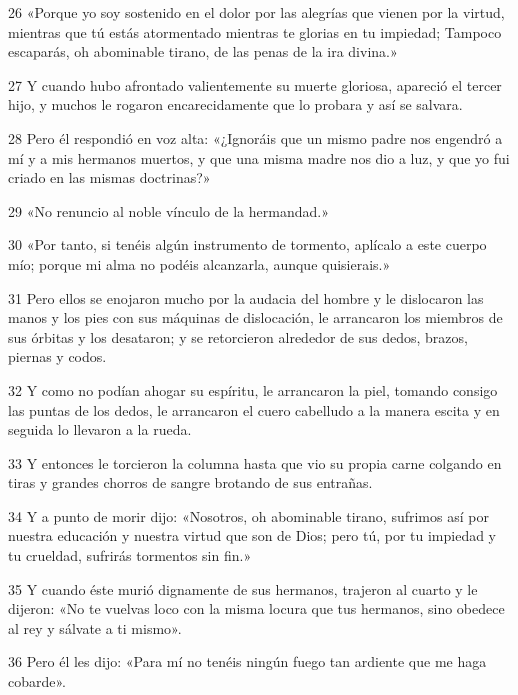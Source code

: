 \par 26 «Porque yo soy sostenido en el dolor por las alegrías que vienen por la virtud, mientras que tú estás atormentado mientras te glorias en tu impiedad; Tampoco escaparás, oh abominable tirano, de las penas de la ira divina.»

\par 27 Y cuando hubo afrontado valientemente su muerte gloriosa, apareció el tercer hijo, y muchos le rogaron encarecidamente que lo probara y así se salvara.

\par 28 Pero él respondió en voz alta: «¿Ignoráis que un mismo padre nos engendró a mí y a mis hermanos muertos, y que una misma madre nos dio a luz, y que yo fui criado en las mismas doctrinas?»

\par 29 «No renuncio al noble vínculo de la hermandad.»

\par 30 «Por tanto, si tenéis algún instrumento de tormento, aplícalo a este cuerpo mío; porque mi alma no podéis alcanzarla, aunque quisierais.»

\par 31 Pero ellos se enojaron mucho por la audacia del hombre y le dislocaron las manos y los pies con sus máquinas de dislocación, le arrancaron los miembros de sus órbitas y los desataron; y se retorcieron alrededor de sus dedos, brazos, piernas y codos.

\par 32 Y como no podían ahogar su espíritu, le arrancaron la piel, tomando consigo las puntas de los dedos, le arrancaron el cuero cabelludo a la manera escita y en seguida lo llevaron a la rueda.

\par 33 Y entonces le torcieron la columna hasta que vio su propia carne colgando en tiras y grandes chorros de sangre brotando de sus entrañas.

\par 34 Y a punto de morir dijo: «Nosotros, oh abominable tirano, sufrimos así por nuestra educación y nuestra virtud que son de Dios; pero tú, por tu impiedad y tu crueldad, sufrirás tormentos sin fin.»

\par 35 Y cuando éste murió dignamente de sus hermanos, trajeron al cuarto y le dijeron: «No te vuelvas loco con la misma locura que tus hermanos, sino obedece al rey y sálvate a ti mismo».

\par 36 Pero él les dijo: «Para mí no tenéis ningún fuego tan ardiente que me haga cobarde».

